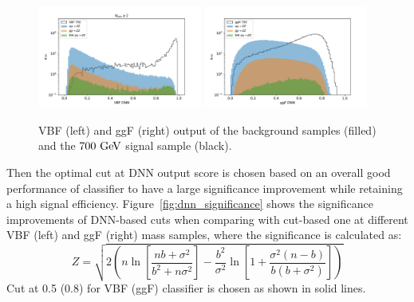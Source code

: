 \begin{figure}[htbp]
        \includegraphics[width=0.48\textwidth]{figures/HMHZZ/selection/vbf_input/clf_output.pdf}
        \includegraphics[width=0.48\textwidth]{figures/HMHZZ/selection/ggf_input/clf_output.pdf}
        \centering
        \caption{VBF (left) and ggF (right) output of the background samples (filled) and the $700~\text{Ge\kern -0.1em V}$ signal sample (black).}
        \label{fig:dnn_output_score}
\end{figure}

Then the optimal cut at DNN output score is chosen based on an overall good performance of classifier to have a large significance improvement while retaining a high signal efficiency.
Figure~\ref{fig:dnn_significance} shows the significance improvements of DNN-based cuts when comparing with cut-based one at different VBF (left) and ggF (right) mass samples,
where the significance is calculated as:
\begin{equation}
Z = \sqrt{2\left(n\ln \left[ \frac{nb+\sigma^2}{b^2+n\sigma^2}\right]
        - \frac{b^2}{\sigma^2}\ln\left[1+\frac{\sigma^2(n-b)}{b(b+\sigma^2)}\right]\right)}
\end{equation}
Cut at 0.5 (0.8) for VBF (ggF) classifier is chosen as shown in solid lines.

